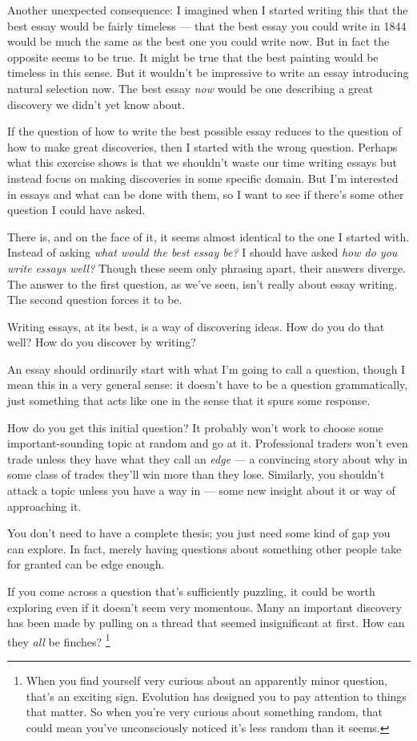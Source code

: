 \documentclass[12pt]{book}
\begin{document}
Another unexpected consequence: I imagined when I started writing this
that the best essay would be fairly timeless --- that the best essay you
could write in 1844 would be much the same as the best one you could
write now. But in fact the opposite seems to be true. It might be true
that the best painting would be timeless in this sense. But it wouldn't
be impressive to write an essay introducing natural selection now. The
best essay \emph{now} would be one describing a great discovery we
didn't yet know about.

If the question of how to write the best possible essay reduces to the
question of how to make great discoveries, then I started with the wrong
question. Perhaps what this exercise shows is that we shouldn't waste
our time writing essays but instead focus on making discoveries in some
specific domain. But I'm interested in essays and what can be done with
them, so I want to see if there's some other question I could have
asked.

There is, and on the face of it, it seems almost identical to the one I
started with. Instead of asking \emph{what would the best essay be?} I
should have asked \emph{how do you write essays well?} Though these seem
only phrasing apart, their answers diverge. The answer to the first
question, as we've seen, isn't really about essay writing. The second
question forces it to be.

Writing essays, at its best, is a way of discovering ideas. How do you
do that well? How do you discover by writing?

An essay should ordinarily start with what I'm going to call a question,
though I mean this in a very general sense: it doesn't have to be a
question grammatically, just something that acts like one in the sense
that it spurs some response.

How do you get this initial question? It probably won't work to choose
some important-sounding topic at random and go at it. Professional
traders won't even trade unless they have what they call an \emph{edge}
--- a convincing story about why in some class of trades they'll win
more than they lose. Similarly, you shouldn't attack a topic unless you
have a way in --- some new insight about it or way of approaching it.

You don't need to have a complete thesis; you just need some kind of gap
you can explore. In fact, merely having questions about something other
people take for granted can be edge enough.

If you come across a question that's sufficiently puzzling, it could be
worth exploring even if it doesn't seem very momentous. Many an
important discovery has been made by pulling on a thread that seemed
insignificant at first. How can they \emph{all} be finches?
\footnote{When you find yourself very curious about an apparently minor
question, that's an exciting sign. Evolution has designed you to pay
attention to things that matter. So when you're very curious about
something random, that could mean you've unconsciously noticed it's less
random than it seems.}
\end{document}
